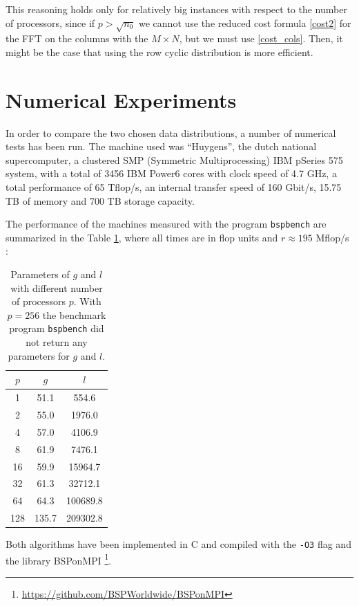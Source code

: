 \documentclass[a4paper,11pt]{article}
\begin{document}
This reasoning holds only for relatively big instances with respect to the number of processors, since if $p > \sqrt{n_0}$ we cannot use the reduced cost formula \eqref{cost2} for the FFT on the columns with the $M \times N$, but we must use \eqref{cost_cols}. Then, it might be the case that using the row cyclic distribution is more efficient.

\section{Numerical Experiments}

In order to compare the two chosen data distributions, a number of numerical tests has been run. The machine used was ``Huygens'', the dutch national supercomputer, a clustered SMP (Symmetric Multiprocessing) IBM pSeries 575 system, with a total of 3456 IBM Power6 cores with clock speed of 4.7 GHz, a total performance of 65 Tflop/s, an internal transfer speed of 160 Gbit/s, 15.75 TB of memory and 700 TB storage capacity.

The performance of the machines measured with the program \verb|bspbench| are summarized in the Table \ref{tab:bench}, where all times are in flop units and $r \approx 195$ Mflop/s :

\begin{table}[H]
\begin{center}
\begin{tabular}{|ccc|}
\hline
$p$ & $g$ & $l$ \\
\hline
1 & 51.1 & 554.6 \\
2 & 55.0 & 1976.0 \\
4 & 57.0 & 4106.9 \\
8 & 61.9 & 7476.1 \\
16 & 59.9 & 15964.7 \\
32 & 61.3 & 32712.1 \\
64 & 64.3 & 100689.8 \\
128 & 135.7 & 209302.8 \\
\hline
\end{tabular}
\caption{Parameters of $g$ and $l$ with different number of processors $p$. With $p=256$ the benchmark program \texttt{bspbench} did not return any parameters for $g$ and $l$.} \label{tab:bench}
\end{center}
\end{table}

Both algorithms have been implemented in C and compiled with the \verb|-O3| flag and the library BSPonMPI \footnote{\url{https://github.com/BSPWorldwide/BSPonMPI}}.
\end{document}
